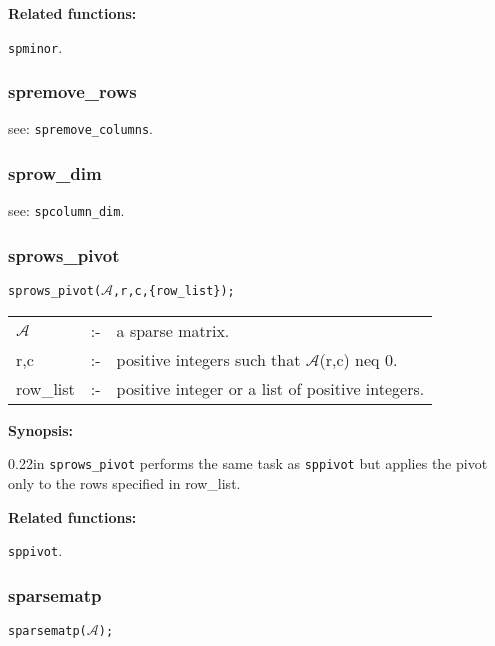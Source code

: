 \textbf{Related functions:}

\hspace*{0.175in} \texttt{spminor}.


\subsubsection{spremove\_rows}

\hspace*{0.175in} see: \texttt{spremove\_columns}.


\subsubsection{sprow\_dim}

\hspace{0.175in} see: \texttt{spcolumn\_dim}.


\subsubsection{sprows\_pivot}

\hspace*{0.175in} \texttt{sprows\_pivot($\mathcal{A}$,r,c,\{row\_list\});}

\hspace*{0.1in}  
\begin{tabular}{l l l} 
$\mathcal{A}$ &:-& a sparse matrix. \\
r,c        &:-& positive integers such that $\mathcal{A}$(r,c) neq 0.\\
row\_list  &:-& positive integer or a list of positive integers.
\end{tabular}

\textbf{Synopsis:}

\begin{addtolength}{\leftskip}{0.22in}
\texttt{sprows\_pivot} performs the same task as \texttt{sppivot} but applies 
the pivot only to the rows specified in row\_list.

\end{addtolength}

\textbf{Related functions:}

\hspace*{0.175in} \texttt{sppivot}.

\subsubsection{sparsematp}

\hspace*{0.175in} \texttt{sparsematp($\mathcal{A}$);}

